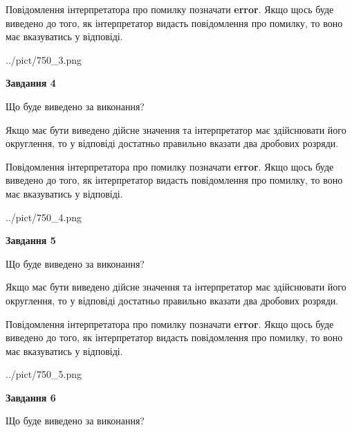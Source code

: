 \documentclass[12pt, ukrainian]{article}
\begin{document}
{\begin {Large}
Повідомлення інтерпретатора про помилку позначати \textbf{error}.
Якщо щось буде виведено до того, як інтерпретатор видасть повідомлення про помилку, 
то воно має вказуватись у відповіді. \par

\begin{center}
	{../pict/750_3.png}
\end{center}
\newpage

{\begin {center}\textbf{Завдання 4}\end {center}}\par
Що буде виведено за виконання? \par

Якщо має бути виведено дійсне значення та інтерпретатор має здійснювати його округлення, 
то у відповіді достатньо правильно вказати два дробових розряди.

Повідомлення інтерпретатора про помилку позначати \textbf{error}.
Якщо щось буде виведено до того, як інтерпретатор видасть повідомлення про помилку, 
то воно має вказуватись у відповіді. \par

\begin{center}
	{../pict/750_4.png}
\end{center}
\newpage

{\begin {center}\textbf{Завдання 5}\end {center}}\par
Що буде виведено за виконання? \par

Якщо має бути виведено дійсне значення та інтерпретатор має здійснювати його округлення, 
то у відповіді достатньо правильно вказати два дробових розряди.

Повідомлення інтерпретатора про помилку позначати \textbf{error}.
Якщо щось буде виведено до того, як інтерпретатор видасть повідомлення про помилку, 
то воно має вказуватись у відповіді. \par

\begin{center}
	{../pict/750_5.png}
\end{center}
\newpage

{\begin {center}\textbf{Завдання 6}\end {center}}\par
Що буде виведено за виконання? \par


\end{Large}}
\end{document}
